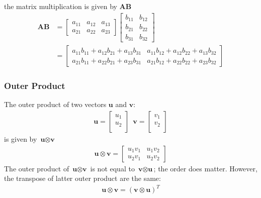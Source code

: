  the matrix multiplication is given by \textbf{AB}
\begin{align}
  \textbf{A}\textbf{B} &= \begin{bmatrix}
    a_{11} & a_{12} & a_{13} \\
    a_{21} & a_{22} & a_{23}
  \end{bmatrix} \begin{bmatrix}
    b_{11} & b_{12} \\
    b_{21} & b_{22} \\
    b_{31} & b_{32}
  \end{bmatrix} \\
  &= \begin{bmatrix}
    a_{11}b_{11} + a_{12}b_{21} + a_{13}b_{31} &  a_{11}b_{12} + a_{12}b_{22} + a_{13}b_{32} \\
    a_{21}b_{11} + a_{22}b_{21} + a_{23}b_{31} &  a_{21}b_{12} + a_{22}b_{22} + a_{23}b_{32}
  \end{bmatrix}
\end{align}
\subsubsection{Outer Product}
\noindent The outer product of two vectors $\textbf{u}$ and $\textbf{v}$: 
\begin{align}
    \textbf{u} = \begin{bmatrix}
        u_1 \\
        u_2 \\
      \end{bmatrix} \, \, \, 
      \textbf{v} = \begin{bmatrix}
        v_1 \\
        v_2 \\
      \end{bmatrix}
\end{align}
is given by $\textbf{u}\otimes\textbf{v}$
\begin{align}
  \textbf{u}\otimes\textbf{v} = \begin{bmatrix}
    u_1v_1 & u_1v_2 \\
    u_2v_1 & u_2v_2
  \end{bmatrix}
\end{align}
The outer product of $\textbf{u}\otimes\textbf{v}$ is not equal to $\textbf{v}\otimes\textbf{u}$; the order does matter. However, the transpose of latter outer product are the same:
\begin{align}
  \textbf{u}\otimes\textbf{v} = (\textbf{v}\otimes\textbf{u})^T
\end{align}
